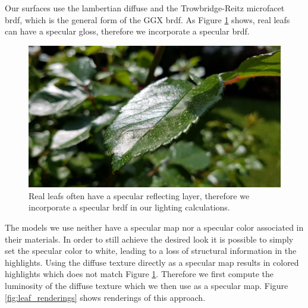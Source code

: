 Our surfaces use the lambertian diffuse \cite{lambert} and the Trowbridge-Reitz \cite{trowbridge_reitz} microfacet \ac{brdf}, which is the general form of the GGX \ac{brdf}.
As Figure \ref{fig:leaf_gloss} shows, real leafs can have a specular gloss, therefore we incorporate a specular \ac{brdf}.
\begin{figure}[ht]
    \centering
    \includegraphics[width=0.5\linewidth]{img/leaf_gloss.jpg}
    \caption[Leaf with glossy surface]{Real leafs often have a specular reflecting layer, therefore we incorporate a specular \ac{brdf} in our lighting calculations.}
    \label{fig:leaf_gloss}
\end{figure} 
The models we use neither have a specular map nor a specular color associated in their materials.
In order to still achieve the desired look it is possible to simply set the specular color to white, leading to a loss of structural information in the highlights.
Using the diffuse texture directly as a specular map results in colored highlights which does not match Figure \ref{fig:leaf_gloss}.
Therefore we first compute the luminosity of the diffuse texture which we then use as a specular map.
Figure \ref{fig:leaf_renderings} shows renderings of this approach.
